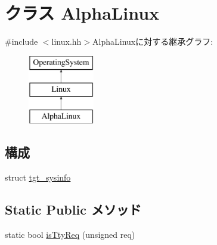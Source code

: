 \hypertarget{classAlphaLinux}{
\section{クラス AlphaLinux}
\label{classAlphaLinux}
}


{\ttfamily \#include $<$linux.hh$>$}AlphaLinuxに対する継承グラフ:\begin{figure}[H]
\begin{center}
\leavevmode
\includegraphics[height=3cm]{classAlphaLinux}
\end{center}
\end{figure}
\subsection*{構成}
\begin{DoxyCompactItemize}
\item 
struct \hyperlink{structAlphaLinux_1_1tgt__sysinfo}{tgt\_\-sysinfo}
\end{DoxyCompactItemize}
\subsection*{Static Public メソッド}
\begin{DoxyCompactItemize}
\item 
static bool \hyperlink{classAlphaLinux_ab20bdd4422ecf6e1736a5587be296b3f}{isTtyReq} (unsigned req)
\end{DoxyCompactItemize}
